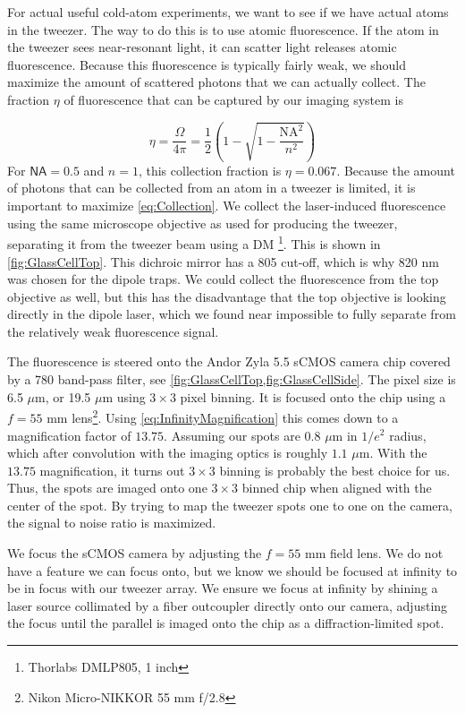 For actual useful cold-atom experiments, we want to see if we have actual atoms in the tweezer. 
The way to do this is to use atomic fluorescence.
If the atom in the tweezer sees near-resonant light, it can scatter light releases atomic fluorescence. 
Because this fluorescence is typically fairly weak, we should maximize the amount of scattered photons that we can actually collect. 
The fraction $\eta$ of fluorescence that can be captured by our imaging system is 

\begin{equation}\label{eq:Collection}
    \eta = \frac{\Omega}{4\pi} = 
    \frac{1}{2}\left(1-\sqrt{1-\frac{\text{NA}^2}{n^2}}\right)
\end{equation}
For $\textsf{NA}=0.5$ and $n=1$, this collection fraction is $\eta =0.067$. 
Because the amount of photons that can be collected from an atom in a tweezer is limited, it is important to maximize \cref{eq:Collection}.
We collect the laser-induced fluorescence using the same microscope objective as used for producing the tweezer, separating it from the tweezer beam using a \ac{DM} \footnote{Thorlabs DMLP805, 1 inch}.
This is shown in \cref{fig:GlassCellTop}.
This dichroic mirror has a 805 cut-off, which is why 820 nm was chosen for the dipole traps.
We could collect the fluorescence from the top objective as well, but this has the disadvantage that the top objective is looking directly in the dipole laser, which we found near impossible to fully separate from the relatively weak fluorescence signal. 

The fluorescence is steered onto the Andor Zyla 5.5 sCMOS camera chip covered by a 780 band-pass filter, see \cref{fig:GlassCellTop,fig:GlassCellSide}.
The pixel size is 6.5 $\mu$m, or 19.5 $\mu$m using $3\times3$ pixel binning. 
It is focused onto the chip using a $f= 55$ mm lens\footnote{Nikon Micro-NIKKOR 55 mm f/2.8}.
Using \cref{eq:InfinityMagnification} this comes down to a magnification factor of $13.75$.
Assuming our spots are $0.8$ $\mu$m in $1/e^2$ radius, which after convolution with the imaging optics is roughly $1.1$ $\mu$m.
With the $13.75$ magnification, it turns out $3\times 3$ binning is probably the best choice for us. 
Thus, the spots are imaged onto one $3\times3$ binned chip when aligned with the center of the spot.
By trying to map the tweezer spots one to one on the camera, the signal to noise ratio is maximized. 

We focus the sCMOS camera by adjusting the $f=55$ mm field lens.
We do not have a feature we can focus onto, but we know we should be focused at infinity to be in focus with our tweezer array. 
We ensure we focus at infinity by shining a laser source collimated by a fiber outcoupler directly onto our camera, adjusting the focus until the parallel is imaged onto the chip as a diffraction-limited spot. 


